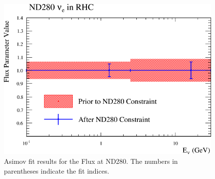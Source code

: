 \begin{figure}
\begin{centering}
{\begin{centering}
\includegraphics[height=0.195\textheight]{Chapters/Figures/Validation/Asimov/nd_nf_nue_flux_parms}
\par\end{centering}
}
\par\end{centering}
\caption[Asimov Fit Results for the Flux at ND280]{Asimov fit results for the Flux at ND280. The numbers in parentheses
indicate the fit indices. \label{fig:Asimov-fit-resultsND} }
\end{figure}

